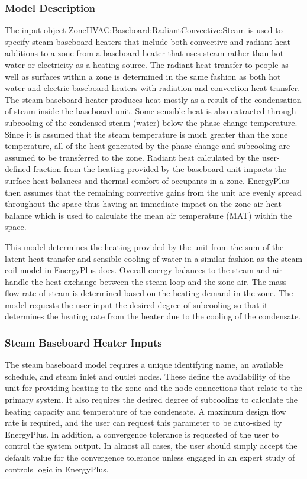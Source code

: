 \subsubsection{Model Description}\label{model-description-1-006}

The input object ZoneHVAC:Baseboard:RadiantConvective:Steam is used to specify steam baseboard heaters that include both convective and radiant heat additions to a zone from a baseboard heater that uses steam rather than hot water or electricity as a heating source. The radiant heat transfer to people as well as surfaces within a zone is determined in the same fashion as both hot water and electric baseboard heaters with radiation and convection heat transfer. The steam baseboard heater produces heat mostly as a result of the condensation of steam inside the baseboard unit.  Some sensible heat is also extracted through subcooling of the condensed steam (water) below the phase change temperature. Since it is assumed that the steam temperature is much greater than the zone temperature, all of the heat generated by the phase change and subcooling are assumed to be transferred to the zone.  Radiant heat calculated by the user-defined fraction from the heating provided by the baseboard unit impacts the surface heat balances and thermal comfort of occupants in a zone. EnergyPlus then assumes that the remaining convective gains from the unit are evenly spread throughout the space thus having an immediate impact on the zone air heat balance which is used to calculate the mean air temperature (MAT) within the space.

This model determines the heating provided by the unit from the sum of the latent heat transfer and sensible cooling of water in a similar fashion as the steam coil model in EnergyPlus does. Overall energy balances to the steam and air handle the heat exchange between the steam loop and the zone air. The mass flow rate of steam is determined based on the heating demand in the zone. The model requests the user input the desired degree of subcooling so that it determines the heating rate from the heater due to the cooling of the condensate.

\subsubsection{Steam Baseboard Heater Inputs}\label{steam-baseboard-heater-inputs}

The steam baseboard model requires a unique identifying name, an available schedule, and steam inlet and outlet nodes. These define the availability of the unit for providing heating to the zone and the node connections that relate to the primary system. It also requires the desired degree of subcooling to calculate the heating capacity and temperature of the condensate. A maximum design flow rate is required, and the user can request this parameter to be auto-sized by EnergyPlus. In addition, a convergence tolerance is requested of the user to control the system output. In almost all cases, the user should simply accept the default value for the convergence tolerance unless engaged in an expert study of controls logic in EnergyPlus.

